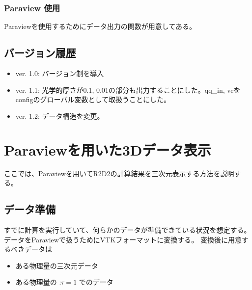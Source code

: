 \documentclass[letterpaper,10pt,dvipdfmx,report]{sphinxmanual}
\begin{document}
\subsection{Paraview 使用}
\label{\detokenize{io:paraview}}
Paraviewを使用するためにデータ出力の関数が用意してある。

\begin{fulllineitems}
\label{\detokenize{io:R2D2.R2D2.vtk.write_3D}}
\end{fulllineitems}



\section{バージョン履歴}
\label{\detokenize{io:id5}}\begin{itemize}
\item {} 
ver. 1.0: バージョン制を導入

\item {} 
ver. 1.1: 光学的厚さが0.1, 0.01の部分も出力することにした。qq\_in, vcをconfigのグローバル変数として取扱うことにした。

\item {} 
ver. 1.2: データ構造を変更。

\end{itemize}


\chapter{Paraviewを用いた3Dデータ表示}
\label{\detokenize{paraview:paraview3d}}\label{\detokenize{paraview::doc}}
ここでは、Paraviewを用いてR2D2の計算結果を三次元表示する方法を説明する。


\section{データ準備}
\label{\detokenize{paraview:id1}}
すでに計算を実行していて、何らかのデータが準備できている状況を想定する。
データをParaviewで扱うためにVTKフォーマットに変換する。
変換後に用意するべきデータは
\begin{itemize}
\item {} 
ある物理量の三次元データ

\item {} 
ある物理量の :\(\tau=1\) でのデータ

\end{itemize}
\end{document}
